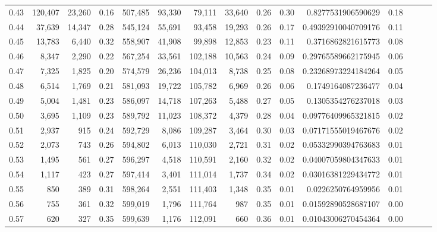 \begin{tabular}{rrrrrrrrrrrrrrr}
0.43 &  120,407 &  23,260 &  0.16 &  507,485 &   93,330 &   79,111 &   33,640 &  0.26 &  0.30 &      0.8277531906590629 &      0.18 \\
0.44 &   37,639 &  14,347 &  0.28 &  545,124 &   55,691 &   93,458 &   19,293 &  0.26 &  0.17 &     0.49392910040709176 &      0.11 \\
0.45 &   13,783 &   6,440 &  0.32 &  558,907 &   41,908 &   99,898 &   12,853 &  0.23 &  0.11 &      0.3716862821615773 &      0.08 \\
0.46 &    8,347 &   2,290 &  0.22 &  567,254 &   33,561 &  102,188 &   10,563 &  0.24 &  0.09 &     0.29765589662175945 &      0.06 \\
0.47 &    7,325 &   1,825 &  0.20 &  574,579 &   26,236 &  104,013 &    8,738 &  0.25 &  0.08 &     0.23268973224184264 &      0.05 \\
0.48 &    6,514 &   1,769 &  0.21 &  581,093 &   19,722 &  105,782 &    6,969 &  0.26 &  0.06 &      0.1749164087236477 &      0.04 \\
0.49 &    5,004 &   1,481 &  0.23 &  586,097 &   14,718 &  107,263 &    5,488 &  0.27 &  0.05 &      0.1305354276237018 &      0.03 \\
0.50 &    3,695 &   1,109 &  0.23 &  589,792 &   11,023 &  108,372 &    4,379 &  0.28 &  0.04 &     0.09776409965321815 &      0.02 \\
0.51 &    2,937 &     915 &  0.24 &  592,729 &    8,086 &  109,287 &    3,464 &  0.30 &  0.03 &     0.07171555019467676 &      0.02 \\
0.52 &    2,073 &     743 &  0.26 &  594,802 &    6,013 &  110,030 &    2,721 &  0.31 &  0.02 &     0.05332990394763683 &      0.01 \\
0.53 &    1,495 &     561 &  0.27 &  596,297 &    4,518 &  110,591 &    2,160 &  0.32 &  0.02 &     0.04007059804347633 &      0.01 \\
0.54 &    1,117 &     423 &  0.27 &  597,414 &    3,401 &  111,014 &    1,737 &  0.34 &  0.02 &     0.03016381229434772 &      0.01 \\
0.55 &      850 &     389 &  0.31 &  598,264 &    2,551 &  111,403 &    1,348 &  0.35 &  0.01 &      0.0226250764959956 &      0.01 \\
0.56 &      755 &     361 &  0.32 &  599,019 &    1,796 &  111,764 &      987 &  0.35 &  0.01 &     0.01592890528687107 &      0.00 \\
0.57 &      620 &     327 &  0.35 &  599,639 &    1,176 &  112,091 &      660 &  0.36 &  0.01 &     0.01043006270454364 &      0.00 \\

\end{tabular}
